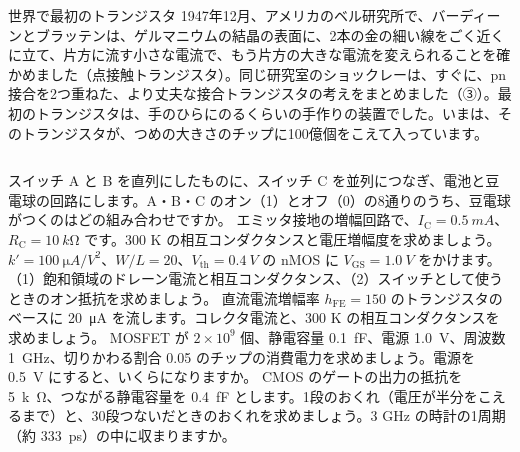 \begin{column}{世界で最初のトランジスタ}
1947年12月、アメリカのベル研究所で、バーディーンとブラッテンは、ゲルマニウムの結晶の表面に、2本の金の細い線をごく近くに立て、片方に流す小さな電流で、もう片方の大きな電流を変えられることを確かめました（点接触トランジスタ）。同じ研究室のショックレーは、すぐに、pn 接合を2つ重ねた、より丈夫な接合トランジスタの考えをまとめました（③）。最初のトランジスタは、手のひらにのるくらいの手作りの装置でした。いまは、そのトランジスタが、つめの大きさのチップに100億個をこえて入っています。
\end{column}

\bkendproblems
{}
\bkproblem スイッチ A と B を直列にしたものに、スイッチ C を並列につなぎ、電池と豆電球の回路にします。A・B・C のオン（1）とオフ（0）の8通りのうち、豆電球がつくのはどの組み合わせですか。
\bkproblem エミッタ接地の増幅回路で、$I_{\mathrm C}=\qty{0.5}{mA}$、$R_{\mathrm C}=\qty{10}{k\ohm}$ です。300 K の相互コンダクタンスと電圧増幅度を求めましょう。
\bkproblem $k'=\qty{100}{\micro A/V^2}$、$W/L=20$、$V_{\mathrm{th}}=\qty{0.4}{V}$ の nMOS に $V_{\mathrm{GS}}=\qty{1.0}{V}$ をかけます。（1）飽和領域のドレーン電流と相互コンダクタンス、（2）スイッチとして使うときのオン抵抗を求めましょう。
\bkproblem 直流電流増幅率 $h_{\mathrm{FE}}=150$ のトランジスタのベースに \qty{20}{\micro A} を流します。コレクタ電流と、300 K の相互コンダクタンスを求めましょう。
\bkproblem MOSFET が $2\times10^9$ 個、静電容量 \qty{0.1}{fF}、電源 \qty{1.0}{V}、周波数 \qty{1}{GHz}、切りかわる割合 0.05 のチップの消費電力を求めましょう。電源を \qty{0.5}{V} にすると、いくらになりますか。
\bkproblem CMOS のゲートの出力の抵抗を \qty{5}{k\ohm}、つながる静電容量を \qty{0.4}{fF} とします。1段のおくれ（電圧が半分をこえるまで）と、30段つないだときのおくれを求めましょう。3 GHz の時計の1周期（約 \qty{333}{ps}）の中に収まりますか。

